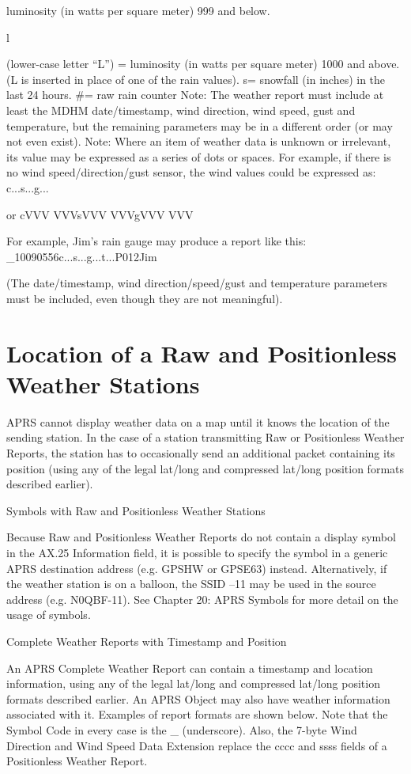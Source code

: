 luminosity (in watts per square meter) 999 and below.

l

(lower-case letter “L”) = luminosity (in watts per square meter)
1000 and above.
(L is inserted in place of one of the rain values).
s=
snowfall (in inches) in the last 24 hours.
#=
raw rain counter
Note: The weather report must include at least the MDHM date/timestamp,
wind direction, wind speed, gust and temperature, but the remaining
parameters may be in a different order (or may not even exist).
Note: Where an item of weather data is unknown or irrelevant, its value may
be expressed as a series of dots or spaces. For example, if there is no wind
speed/direction/gust sensor, the wind values could be expressed as:
c...s...g...

or cVVV
VVVsVVV
VVVgVVV
VVV

For example, Jim’s rain gauge may produce a report like this:
_10090556c...s...g...t...P012Jim

(The date/timestamp, wind direction/speed/gust and temperature parameters
must be included, even though they are not meaningful).


\section{Location of a Raw and Positionless Weather Stations}

APRS cannot display weather data on a map until it knows the location of the
sending station. In the case of a station transmitting Raw or Positionless
Weather Reports, the station has to occasionally send an additional packet
containing its position (using any of the legal lat/long and compressed
lat/long position formats described earlier).

Symbols with Raw
and Positionless
Weather Stations

Because Raw and Positionless Weather Reports do not contain a display
symbol in the AX.25 Information field, it is possible to specify the symbol in
a generic APRS destination address (e.g. GPSHW or GPSE63) instead.
Alternatively, if the weather station is on a balloon, the SSID –11 may be
used in the source address (e.g. N0QBF-11).
See Chapter 20: APRS Symbols for more detail on the usage of symbols.

Complete Weather
Reports with
Timestamp and
Position

An APRS Complete Weather Report can contain a timestamp and location
information, using any of the legal lat/long and compressed lat/long position
formats described earlier. An APRS Object may also have weather
information associated with it.
Examples of report formats are shown below. Note that the Symbol Code in
every case is the _ (underscore). Also, the 7-byte Wind Direction and Wind
Speed Data Extension replace the cccc and ssss fields of a Positionless
Weather Report.

